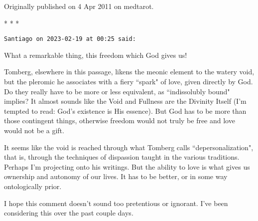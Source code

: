 Originally published on 4 Apr 2011 on medtarot.


\begin{center}* * *\end{center}

\begin{footnotesize}\begin{sffamily}



\texttt{Santiago on 2023-02-19 at 00:25 said: }

What a remarkable thing, this freedom which God gives us!

Tomberg, elsewhere in this passage, likens the meonic element to the watery void, but the pleromic he associates with a fiery ``spark" of love, given directly by God. Do they really have to be more or less equivalent, as ``indissolubly bound" implies? It almost sounds like the Void and Fullness are the Divinity Itself (I'm tempted to read: God's existence is His essence). But God has to be more than those contingent things, otherwise freedom would not truly be free and love would not be a gift.

It seems like the void is reached through what Tomberg calls ``depersonalization", that is, through the techniques of dispassion taught in the various traditions. Perhaps I'm projecting onto his writings. But the ability to love is what gives us ownership and autonomy of our lives. It has to be better, or in some way ontologically prior.

I hope this comment doesn't sound too pretentious or ignorant. I've been considering this over the past couple days.


\end{sffamily}\end{footnotesize}

